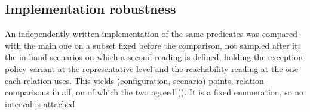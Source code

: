 \begin{table}[t]
\centering
\caption{The published authorization relations executed against Gitea
\NtGiteaVersion{}. Each row is the applicability chain from the catalogue to the
outcome: \emph{status} is the engine's per-relation result (\NtMrExecuted{} of
\NtMrTotal{} evaluated, \NtMrErrored{} aborted on an engine-side defect),
\emph{alarms} its own \texttt{getFailures()} return (\NtMrFired{} relations,
\NtAlarms{} in all), and \emph{requests} (\NtHttpCalls{} total) attributed to the
relation observing them first.}
\label{tab:native}
\small

\end{table}

\subsection{Implementation robustness}
\label{sec:secondimpl}

An independently written implementation of the same predicates was compared with the main one on a
subset fixed before the comparison, not sampled after it: the in-band scenarios on which a second
reading is defined, holding the exception-policy variant at the representative level and the
reachability reading at the one each relation uses. This yields \ResAltPoints{} (configuration,
scenario) points, \ResAltCompared{} relation comparisons in all, on \ResAltAgree{} of which the
two agreed (\ResAltAgreeRate{}). It is a fixed enumeration, so no interval is attached.
